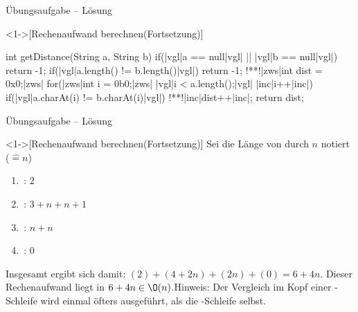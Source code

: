 \begin{frame}[fragile,c]{Übungsaufgabe -- Lösung}
    \addtocounter{solve}{-1}%
    \begin{solve}<1->[Rechenaufwand berechnen\hfill{}(Fortsetzung)]
\begin{plainjava}[language=xJava]
int getDistance(String a, String b){
    if(|vgl|a == null|vgl| || |vgl|b == null|vgl|) return -1;
    if(|vgl|a.length() != b.length()|vgl|) return -1;
    !**!|zws|int dist = 0x0;|zws|
    for(|zws|int i = 0b0;|zws| |vgl|i < a.length();|vgl| |inc|i++|inc|)
        if(|vgl|a.charAt(i) != b.charAt(i)|vgl|)
            !**!|inc|dist++|inc|;
    return dist;
}
\end{plainjava}
    \end{solve}
\end{frame}


\begin{frame}[c]{Übungsaufgabe -- Lösung}
    \addtocounter{solve}{-1}%
    \begin{solve}<1->[Rechenaufwand berechnen\hfill{}(Fortsetzung)]
        \pause{}Sei die Länge von  durch \(n\) notiert (\(\widehat{=} n\))
\begin{multicols}{2}
    \begin{enumerate}[<+(1)->]
        \item {}\,: \(2\)
        \item {}\,: \(3 + n + n + 1\)
        \item {}\,: \(n+n\)
        \item {}\,: \(0\)
    \end{enumerate}
\end{multicols}
    \pause{}Insgesamt ergibt sich damit: \((2) + (4 + 2n) + (2n) + (0) = 6 + 4n\).\pause{} Dieser Rechenaufwand liegt in \(6 + 4n \in \O(n)\).\smallskip\newline\pause{}Hinweis:\pause{} Der Vergleich im Kopf einer -Schleife wird einmal öfters ausgeführt,\pause{} als die -Schleife selbst.
    \end{solve}
\end{frame}


